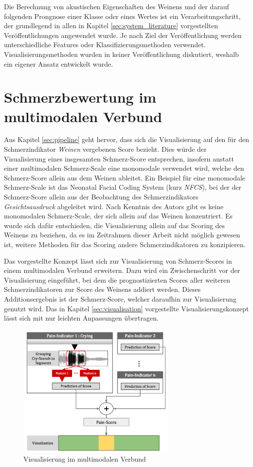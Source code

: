 Die Berechnung von akustischen Eigenschaften des Weinens und der darauf folgenden Prongnose einer Klasse oder eines Wertes ist ein Verarbeitungschritt, der grundlegend in allen in Kapitel \ref{sec:system_literature} vorgestellten Veröffentlichungen angewendet wurde. Je nach Ziel der Veröffentlichung werden unterschiedliche Features oder Klassifizierungsmethoden verwendet. Visualisierungsmethoden wurden in keiner Veröffentlichung diskutiert, weshalb ein eigener Ansatz entwickelt wurde.

\section{Schmerzbewertung im multimodalen Verbund}
\label{sec:multimodal_integration}

Aus Kapitel \ref{sec:pipeline} geht hervor, dass sich die Visualisierung auf den für den Schmerzindikator \emph{Weinen} vergebenen Score bezieht. Dies würde der Visualisierung eines insgesamten Schmerz-Score entsprechen, insofern anstatt einer multimodalen Schmerz-Scale eine monomodale verwendet wird, welche den Schmerz-Score allein aus dem Weinen ableitet. Ein Beispiel für eine monomodale Schmerz-Scale ist das \glqq Neonatal Facial Coding System\grqq{} (kurz \emph{NFCS}), bei der der Schmerz-Score allein aus der Beobachtung des Schmerzindikators \emph{Gesichtsausdruck} abgeleitet wird.\cite[S. 70]{PainAssessment02} Nach Kenntnis des Autors gibt es keine monomodalen Schmerz-Scale, der sich allein auf das Weinen konzentriert. Es wurde sich dafür entschieden, die Visualisierung allein auf das Scoring des Weinens zu beziehen, da es im Zeitrahmen dieser Arbeit nicht möglich gewesen ist, weitere Methoden für das Scoring andere Schmerzindikatoren zu konzipieren.

Das vorgestellte Konzept lässt sich zur Visualisierung von Schmerz-Scores in einem multimodalen Verbund erweitern. Dazu wird ein Zwischenschritt vor der Visualisierung eingeführt, bei dem die prognostizierten Scores aller weiteren Schmerzindikatoren zur Score des Weinens addiert werden. Dieses Additionsergebnis ist der Schmerz-Score, welcher daraufhin zur Visualisierung genutzt wird. Das in Kapitel  \ref{sec:visualisation} vorgestellte Visualisierungskonzept lässt sich mit nur leichten Anpassungen übertragen.

\begin{figure}[h]
	\centering
	\includegraphics[width=0.7\textwidth]{bilder/multimodal_viz_02.png}
	\caption{Visualisierung im multimodalen Verbund}
	\label{img:multimodal-overview}
\end{figure}